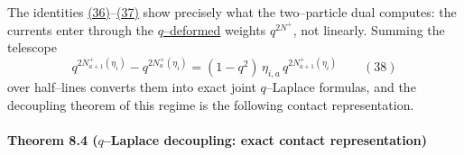 \documentclass[11pt]{article}
\theoremstyle{plain}
\theoremstyle{definition}
\theoremstyle{remark}
\begin{document}
The identities \hyperref[eq_tri1]{(36)}--\hyperref[eq_tri2]{(37)} show precisely what the two--particle
dual computes: the currents enter through the \underline{$q$--deformed} weights
$q^{2N^+}$, not linearly. Summing the telescope
\label{eq_telescope}
\begin{equation}
  q^{2N^+_{a+1}(\eta_i)}-q^{2N^+_{a}(\eta_i)}
  =(1-q^2)\,\eta_{i,a}\,q^{2N^+_{a+1}(\eta_i)}\qquad(38)
\end{equation}
over half--lines converts them into exact joint $q$--Laplace formulas, and the
decoupling theorem of this regime is the following contact representation.

\paragraph{Theorem 8.4 ($q$--Laplace decoupling: exact contact representation)}\label{thm_cov}
\end{document}
